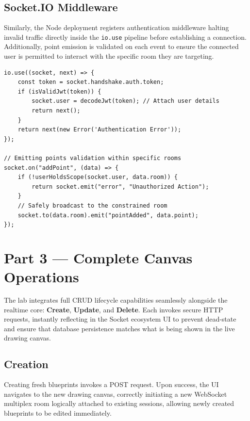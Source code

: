 \documentclass[10pt,a4paper,twocolumn]{article}
\begin{document}
\subsection{Socket.IO Middleware}
Similarly, the Node deployment registers authentication middleware halting invalid traffic directly inside the \texttt{io.use} pipeline before establishing a connection. Additionally, point emission is validated on each event to ensure the connected user is permitted to interact with the specific room they are targeting.

\begin{lstlisting}[style=javacode, caption={Socket.IO handshake validation middleware}]
io.use((socket, next) => {
    const token = socket.handshake.auth.token;
    if (isValidJwt(token)) {
        socket.user = decodeJwt(token); // Attach user details
        return next();
    }
    return next(new Error('Authentication Error'));
});

// Emitting points validation within specific rooms
socket.on("addPoint", (data) => {
    if (!userHoldsScope(socket.user, data.room)) {
        return socket.emit("error", "Unauthorized Action");
    }
    // Safely broadcast to the constrained room
    socket.to(data.room).emit("pointAdded", data.point);
});
\end{lstlisting}

\section{Part 3 --- Complete Canvas Operations}

The lab integrates full CRUD lifecycle capabilities seamlessly alongside the realtime core: 
\textbf{Create}, \textbf{Update}, and \textbf{Delete}. Each invokes secure HTTP 
requests, instantly reflecting in the Socket ecosystem UI to prevent dead-state and ensure that database persistence matches what is being shown in the live drawing canvas.

\subsection{Creation}
Creating fresh blueprints invokes a POST request. Upon success, the UI navigates to the new drawing canvas, correctly initiating a new WebSocket multiplex room logically attached to existing sessions, allowing newly created blueprints to be edited immediately.
\end{document}
